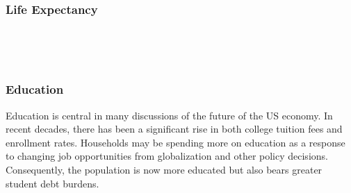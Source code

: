 \hspace{-11mm}  \hspace{-5mm} 

\vspace{-4.5mm}
\vspace{4mm}

\begin{minipage}{0.76\textwidth}  
\subsubsection*{Life Expectancy}
\vspace{2.5mm}

\small 
\end{minipage}

\begin{minipage}{0.36\textwidth}
\\
\\
\end{minipage}\hspace{5mm}
\begin{minipage}{0.36\textwidth}
\small 
\end{minipage}
\newpage
\subsubsection*{Education}
\begin{minipage}{0.76\textwidth} 
\small Education is central in many discussions of the future of the US economy. In recent decades, there has been a significant rise in both college tuition fees and enrollment rates. Households may be spending more on education as a response to changing job opportunities from globalization and other policy decisions. Consequently, the population is now more educated but also bears greater student debt burdens.
\end{minipage}
\vspace{0.5mm}

